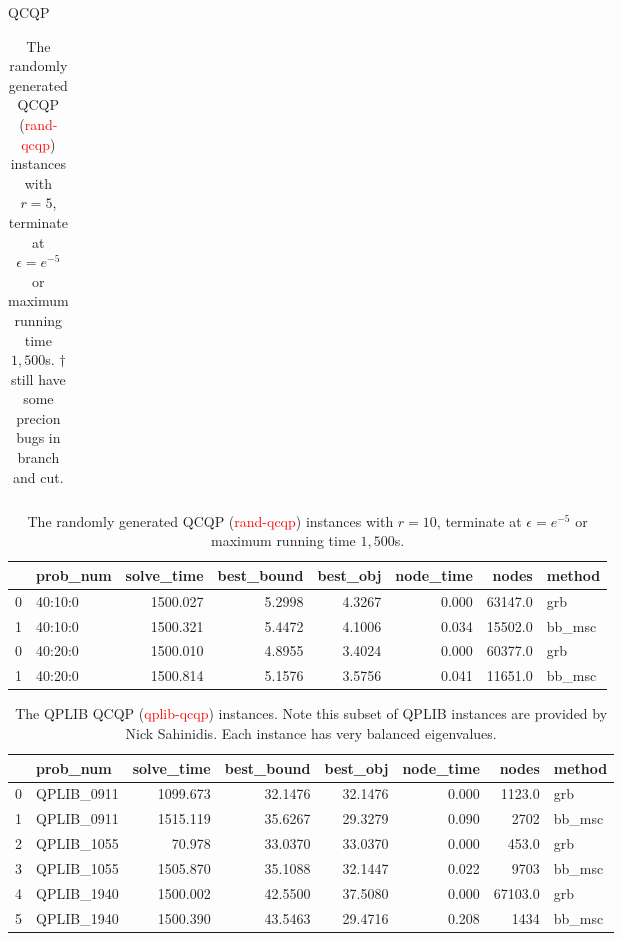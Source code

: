 \documentclass[aspectratio=1610, 9pt]{beamer}
\newcommand{\redsf}[1]{\textcolor{red}{\textsf{#1}}}
\begin{document}
\begin{frame}[standout]{QCQP}
\begin{table}[h!]
\begin{tabular}{llrrrrrll}
      \bottomrule
    \end{tabular}
    \caption{The randomly generated QCQP (\redsf{rand-qcqp}) instances with \(r = 5\), terminate at \(\epsilon = e^{-5}\) or maximum running time \(1,500\)s. \(\dagger\){still have some precion bugs in branch and cut.}}
  \end{table}
  \begin{table}[h!]
    \begin{tabular}{llrrrrrl}
      \toprule
      {} & prob\_num & solve\_time & best\_bound & best\_obj & node\_time & nodes   & method  \\
      \midrule
      0  & 40:10:0   & 1500.027    & 5.2998      & 4.3267    & 0.000      & 63147.0 & grb     \\
      1  & 40:10:0   & 1500.321    & 5.4472      & 4.1006    & 0.034      & 15502.0 & bb\_msc \\
      0  & 40:20:0   & 1500.010    & 4.8955      & 3.4024    & 0.000      & 60377.0 & grb     \\
      1  & 40:20:0   & 1500.814    & 5.1576      & 3.5756    & 0.041      & 11651.0 & bb\_msc \\

      \bottomrule
    \end{tabular}
    \caption{The randomly generated QCQP (\redsf{rand-qcqp}) instances with \(r = 10\), terminate at \(\epsilon = e^{-5}\) or maximum running time \(1,500\)s. }
  \end{table}
  \begin{table}[h!]
    \begin{tabular}{llrrrrrl}
      \toprule
      {} & prob\_num   & solve\_time & best\_bound & best\_obj & node\_time & nodes   & method  \\
      \midrule
      0  & QPLIB\_0911 & 1099.673    & 32.1476     & 32.1476   & 0.000      & 1123.0  & grb     \\
      1  & QPLIB\_0911 & 1515.119    & 35.6267     & 29.3279   & 0.090      & 2702    & bb\_msc \\
      2  & QPLIB\_1055 & 70.978      & 33.0370     & 33.0370   & 0.000      & 453.0   & grb     \\
      3  & QPLIB\_1055 & 1505.870    & 35.1088     & 32.1447   & 0.022      & 9703    & bb\_msc \\
      4  & QPLIB\_1940 & 1500.002    & 42.5500     & 37.5080   & 0.000      & 67103.0 & grb     \\
      5  & QPLIB\_1940 & 1500.390    & 43.5463     & 29.4716   & 0.208      & 1434    & bb\_msc \\
      \bottomrule
    \end{tabular}
    \caption{The QPLIB QCQP (\redsf{qplib-qcqp}) instances. Note this subset of QPLIB instances are provided by Nick Sahinidis. Each instance has very balanced eigenvalues.}
  \end{table}


\end{frame}
\end{document}
